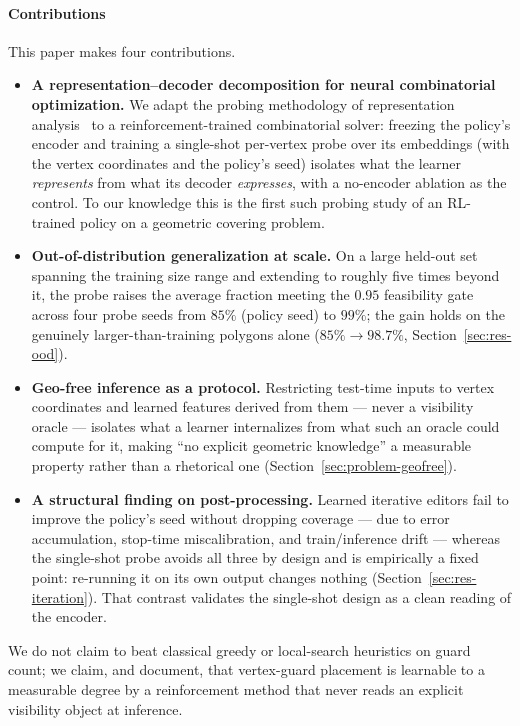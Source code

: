 \documentclass[preprint,10pt]{elsarticle}
\newcommand{\cfeas}{0.95} %
\begin{document}
\paragraph{Contributions} This paper makes four contributions.
\begin{itemize}
  \item[\textbf{C1}] \textbf{A representation--decoder decomposition for neural combinatorial optimization.} We adapt the probing methodology of representation analysis~\cite{AlainBengio2017Probes,HewittLiang2019Probes,Belinkov2022Probing} to a reinforcement-trained combinatorial solver: freezing the policy's encoder and training a single-shot per-vertex probe over its embeddings (with the vertex coordinates and the policy's seed) isolates what the learner \emph{represents} from what its decoder \emph{expresses}, with a no-encoder ablation as the control. To our knowledge this is the first such probing study of an RL-trained policy on a geometric covering problem.
  \item[\textbf{C2}] \textbf{Out-of-distribution generalization at scale.} On a large held-out set spanning the training size range and extending to roughly five times beyond it, the probe raises the average fraction meeting the $\cfeas$ feasibility gate across four probe seeds from $85\%$ (policy seed) to $99\%$; the gain holds on the genuinely larger-than-training polygons alone ($85\% \to 98.7\%$, Section~\ref{sec:res-ood}).
  \item[\textbf{C3}] \textbf{Geo-free inference as a protocol.} Restricting test-time inputs to vertex coordinates and learned features derived from them --- never a visibility oracle --- isolates what a learner internalizes from what such an oracle could compute for it, making ``no explicit geometric knowledge'' a measurable property rather than a rhetorical one (Section~\ref{sec:problem-geofree}).
  
  \item[\textbf{C4}] \textbf{A structural finding on post-processing.} Learned iterative editors fail to improve the policy's seed without dropping coverage --- due to error accumulation, stop-time miscalibration, and train/inference drift --- whereas the single-shot probe avoids all three by design and is empirically a fixed point: re-running it on its own output changes nothing (Section~\ref{sec:res-iteration}). That contrast validates the single-shot design as a clean reading of the encoder.
\end{itemize}
We do not claim to beat classical greedy or local-search heuristics on guard count; we claim, and document, that vertex-guard placement is learnable to a measurable degree by a reinforcement method that never reads an explicit visibility object at inference.
\end{document}
